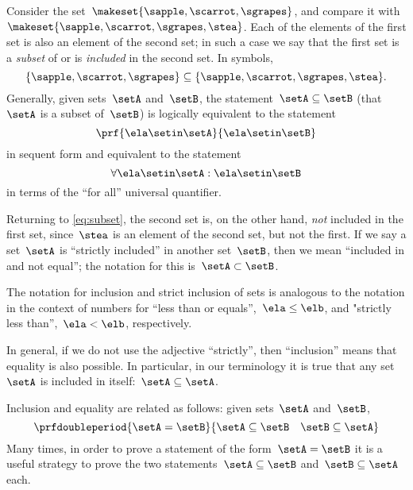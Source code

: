 Consider the set~$\makeset{ \sapple, \scarrot, \sgrapes }$, and compare it with~$\makeset{ \sapple, \scarrot, \sgrapes, \stea }$.
Each of the elements of the first set is also an element of the second set;
in such a case we say that the first set is a \emph{subset} of or is \emph{included} in the second set.
In symbols,
%
\begin{equation}
    \label{eq:subset}
    \{ \sapple, \scarrot, \sgrapes \} \subseteq \{ \sapple, \scarrot, \sgrapes, \stea \}.
\end{equation}
%
Generally, given sets~$\setA$ and~$\setB$, the statement~$\setA \subseteq \setB$ (that~$\setA$ is a subset of~$\setB$) is logically equivalent to the statement
%
\begin{equation}
    \prf{
        \ela \setin\setA
    }{
        \ela \setin\setB
    }
\end{equation}
in sequent form and equivalent to the statement
\begin{equation}\label{eq:inclusion-via-quantifier}
    \forall \ela \setin\setA : \ela \setin\setB
\end{equation}
in terms of the ``for all'' universal quantifier.

Returning to \cref{eq:subset}, the second set is, on the other hand, \emph{not} included in the first set, since~$\stea$ is an element of the second set, but not the first.
If we say a set~$\setA$ is ``strictly included'' in another set~$\setB$, then we mean ``included in and not equal''; the notation for this is~$\setA \subset \setB$.

The notation for inclusion and strict inclusion of sets is analogous to the notation in the context of numbers for ``less than or equals'',~$\ela \leq \elb$,  and "strictly less than'',~$\ela < \elb$, respectively.

In general, if we do not use the adjective ``strictly'', then ``inclusion'' means that equality is also possible.
In particular, in our terminology it is true that any set~$\setA$ is included in itself:~$\setA \subseteq \setA$.

Inclusion and equality are related as follows: given sets~$\setA$ and~$\setB$,
%
\begin{equation*}
    \prfdoubleperiod{
        \setA = \setB
    }{
        {\setA \subseteq \setB}
        \quad
        {\setB \subseteq \setA}
    }
\end{equation*}
%
Many times, in order to prove a statement of the form~$\setA = \setB$ it is a useful strategy to prove the two statements~$\setA \subseteq \setB$ and~$\setB \subseteq \setA$ each.


